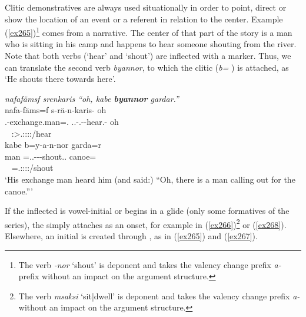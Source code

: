 Clitic demonstratives are always used situationally in order to point, direct or show the location of an event or a referent in relation to the  center. Example (\ref{ex265})\footnote{The verb \emph{-nor} `shout' is deponent and takes the valency change prefix \emph{a-} prefix without an impact on the argument structure.} comes from a narrative. The  center of that part of the story is a man who is sitting in his camp and happens to hear someone shouting from the river. Note that both verbs (`hear' and `shout') are inflected with a  marker. Thus, we can translate the second verb \emph{byannor}, to which the  clitic  (\emph{b=} \Med) is attached, as `He shouts there towards here'.

\begin{exe}
	\ex \emph{nafafämsf srenkaris ``oh, kabe \textbf{byannor} gardar.''}\\
	\glll nafa-fäms=f s-rä-n-karis-\Zero{} oh\\
	\Third.\Poss-exchange.man=\Erg.{\Sg} \Tsg.\Masc.\Bet-\Irr.\Ndu-\Venit-hear.\Rs-\Stsg{} oh\\
	~ {\footnotesize \Stsg:\Sbj>\Tsg.\Masc:\Obj:\Irr:\Pfv:\Venit/hear} ~\\
	\sn
	\glll kabe b=y-a-n-nor garda=r\\
	man \Med=\Tsg.\Masc.\Alph-\Vc-\Venit-shout.\Ext.{\Ndu} canoe={\Purp}\\
	~ {\footnotesize \Med=\Tsg.\Masc:\Sbj:\Nonpast:\Ipfv:\Venit/shout} ~\\
	\trans `His exchange man heard him (and said:) ``Oh, there is a man calling out for the canoe.''' 
	\label{ex265}
\end{exe}

If the inflected  is vowel-initial or begins in a glide (only some formatives of the \Alph{} series), the   simply attaches as an onset, for example in (\ref{ex266})\footnote{The verb \emph{msaksi} `sit|dwell' is deponent and takes the valency change prefix \emph{a-} without an impact on the argument structure.} or (\ref{ex268}). Elsewhere, an initial  is created through , as in (\ref{ex265}) and (\ref{ex267}).

